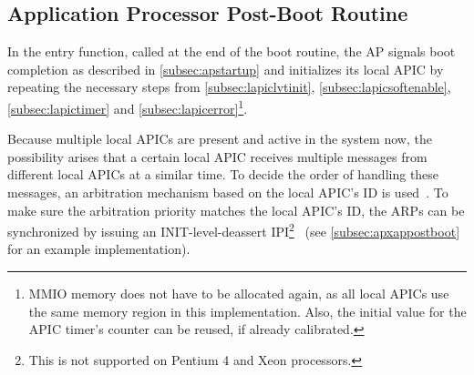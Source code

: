 \subsection{Application Processor Post-Boot Routine}
\label{subsec:apsystementry}

In the entry function, called at the end of the boot routine, the AP signals boot completion as described in \autoref{subsec:apstartup} and initializes its local APIC by repeating the necessary steps from \autoref{subsec:lapiclvtinit}, \autoref{subsec:lapicsoftenable}, \autoref{subsec:lapictimer} and \autoref{subsec:lapicerror}\footnote{
  MMIO memory does not have to be allocated again, as all local APICs use the same memory region in this implementation.
  Also, the initial value for the APIC timer's counter can be reused, if already calibrated.}.

Because multiple local APICs are present and active in the system now, the possibility arises that a certain local APIC receives multiple messages from different local APICs at a similar time.
To decide the order of handling these messages, an arbitration mechanism based on the local APIC's ID is used~\autocite[sec.~3.11.7]{ia32}.
To make sure the arbitration priority matches the local APIC's ID, the ARPs can be synchronized by issuing an INIT-level-deassert IPI\footnote{
  This is not supported on Pentium 4 and Xeon processors.}
\ (see \autoref{subsec:apxappostboot} for an example implementation).

\cleardoublepage